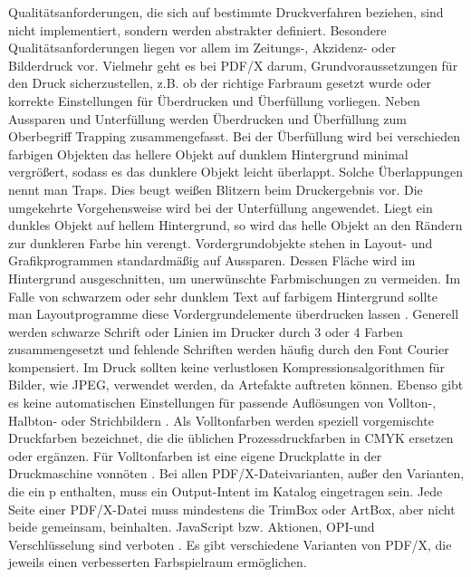 Qualitätsanforderungen, die sich auf bestimmte Druckverfahren beziehen, sind nicht implementiert, sondern werden abstrakter definiert. Besondere Qualitätsanforderungen liegen vor allem im Zeitungs-, Akzidenz- oder Bilderdruck vor. Vielmehr geht es bei PDF/X darum, Grundvoraussetzungen für den Druck sicherzustellen, z.B. ob der richtige Farbraum gesetzt wurde oder korrekte Einstellungen für Überdrucken und Überfüllung vorliegen. Neben Aussparen und Unterfüllung werden Überdrucken und Überfüllung zum Oberbegriff Trapping zusammengefasst. Bei der Überfüllung wird bei verschieden farbigen Objekten das hellere Objekt auf dunklem Hintergrund minimal vergrößert, sodass es das dunklere Objekt leicht überlappt. Solche Überlappungen nennt man Traps. Dies beugt weißen Blitzern beim Druckergebnis vor. Die umgekehrte Vorgehensweise wird bei der Unterfüllung angewendet. Liegt ein dunkles Objekt auf hellem Hintergrund, so wird das helle Objekt an den Rändern zur dunkleren Farbe hin verengt. Vordergrundobjekte stehen in Layout- und Grafikprogrammen standardmäßig auf Aussparen. Dessen Fläche wird im Hintergrund ausgeschnitten, um unerwünschte Farbmischungen zu vermeiden. Im Falle von schwarzem oder sehr dunklem Text auf farbigem Hintergrund sollte man Layoutprogramme diese Vordergrundelemente überdrucken lassen \cite{kompendium}. Generell werden schwarze Schrift oder Linien im Drucker durch 3 oder 4 Farben zusammengesetzt und fehlende Schriften werden häufig durch den Font Courier kompensiert. Im Druck sollten keine verlustlosen Kompressionsalgorithmen für Bilder, wie JPEG, verwendet werden, da Artefakte auftreten können. Ebenso gibt es keine automatischen Einstellungen für passende Auflösungen von Vollton-, Halbton- oder Strichbildern \cite{adobe-pdf-x}. Als Volltonfarben werden speziell vorgemischte Druckfarben bezeichnet, die die üblichen Prozessdruckfarben in CMYK ersetzen oder ergänzen. Für Volltonfarben ist eine eigene Druckplatte in der Druckmaschine vonnöten \cite{adobe-voll}. Bei allen PDF/X-Dateivarianten, außer den Varianten, die ein p enthalten, muss ein Output-Intent im Katalog eingetragen sein. Jede Seite einer PDF/X-Datei muss mindestens die TrimBox oder ArtBox, aber nicht beide gemeinsam, beinhalten. JavaScript bzw. Aktionen, OPI-und Verschlüsselung sind verboten \cite{schneeberger}. Es gibt verschiedene Varianten von PDF/X, die jeweils einen verbesserten Farbspielraum ermöglichen. 


